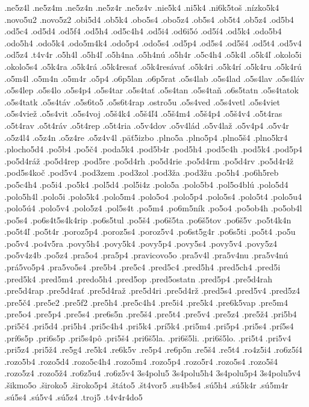 {.ne5z4l
.ne5z4m
.ne5z4n
.ne5z4r
.ne5z4v
.nie5k4
.ni5k4
.ni6k5toš
.nízko5k4
.novo5u2
.novo5z2
.obi5d4
.ob5k4
.obo5s4
.obo5z4
.ob5s4
.ob5t4
.ob5z4
.od5b4
.od5c4
.od5d4
.od5f4
.od5h4
.od5c4h4
.od5i4
.od6i5ó
.od5í4
.od5k4
.odo5b4
.odo5h4
.odo5k4
.odo5m4k4
.odo5p4
.odo5s4
.od5p4
.od5s4
.od5š4
.od5t4
.od5v4
.od5z4
.t4v4r
.o5h4l
.o5h4ľ
.o5h4na
.o5h4nú
.o5h4r
.o5c4h4
.o5k4l
.o5k4ľ
.okolo5i
.okolo5s4
.o5k4ra
.o5k4rá
.o5k4resať
.o5k4resávať
.o5k4ri
.o5k4rí
.o5k4ru
.o5k4rú
.o5m4l
.o5m4n
.o5m4r
.o5p4
.o6p5lan
.o6p5rat
.o5s4lab
.o5s4lad
.o5s4lav
.o5s4láv
.o5s4lep
.o5s4lo
.o5s4p4
.o5s4tar
.o5s4tať
.o5s4tan
.o5s4taň
.o6s5tatn
.o5s4tatok
.o5s4tatk
.o5s4táv
.o5s6to5
.o5s6t4rap
.ostro5u
.o5s4ved
.o5s4vetl
.o5s4viet
.o5s4viež
.o5s4vit
.o5s4voj
.o5š4k4
.o5š4ľ4
.o5š4m4
.o5š4p4
.o5š4v4
.o5t4ras
.o5t4rav
.o5t4ráv
.o5t4rep
.o5t4ria
.o5v4dov
.o5v4lád
.o5v4laž
.o5v4p4
.o5v4r
.o5z4l4
.o5z4n
.o5z4re
.o5z4v4l
.päť5izbo
.plno5a
.plno5p4
.plno5š4
.plno5kr4
.plocho5d4
.po5b4
.po5č4
.poda5k4
.pod5b4r
.pod5h4
.pod5c4h
.pod5k4
.pod5p4
.po5d4ráž
.po5d4rep
.pod5re
.po5d4rh
.po5d4rie
.po5d4rm
.po5d4rv
.po5d4r4ž
.pod5s4koč
.pod5v4
.pod3zem
.pod3zol
.pod3ža
.pod3žu
.po5h4
.po6h5reb
.po5c4h4
.po5i4
.po5k4
.pol5d4
.pol5i4z
.polo5a
.polo5b4
.pol5o4blú
.polo5d4
.polo5h4l
.polo5i
.polo5k4
.polo5m4
.polo5o4
.polo5p4
.polo5s4
.polo5t4
.polo5u4
.polo5ú4
.polo5v4
.polo5z4
.pol5s4t
.po5m4
.po6m5ník
.po5o4
.po5ob4h
.po5ob4l
.po5s4
.po6s4t5s4k4rip
.po6s5tul
.po5š4
.po6š5ta
.po6š5tov
.po6š5v
.po5t4k4n
.po5t4ľ
.po5t4r
.poroz5p4
.poroz5s4
.poroz5v4
.po6st5g4r
.po6s5ti
.po5t4
.po5u
.po5v4
.po4v5ra
.povy5h4
.povy5k4
.povy5p4
.povy5s4
.povy5v4
.povy5z4
.po5v4z4b
.po5z4
.pra5o4
.pra5p4
.pravicovo5o
.pra5v4l
.pra5v4nu
.pra5v4nú
.prá5vo5p4
.pra5vo5s4
.pre5b4
.pre5c4
.pred5c4
.pred5h4
.pred5ch4
.pred5i
.pred5k4
.pred5m4
.predo5h4
.pred5op
.pred5ostatn
.pred5p4
.pre5d4rah
.pre5d4rap
.pre5d4rať
.pre5d4raž
.pre5d4ri
.pre5d4rž
.pred5s4
.pred5v4
.pred5z4
.pre5č4
.pre5e2
.pre5f2
.pre5h4
.pre5c4h4
.pre5i4
.pre5k4
.pre6k5vap
.pre5m4
.pre5o4
.pre5p4
.pre5s4
.pre6s5n
.pre5š4
.pre5t4
.pre5v4
.pre5z4
.pre5ž4
.pri5b4
.pri5č4
.pri5d4
.pri5h4
.pri5c4h4
.pri5k4
.prí5k4
.pri5m4
.pri5p4
.pri5s4
.prí5s4
.prí6s5p
.pri6s5p
.pri5s4pô
.pri5š4
.pri6š5la.
.pri6š5li.
.pri6š5lo.
.pri5t4
.pri5v4
.pri5z4
.pri5ž4
.re5g4
.re5k4
.re6k5v
.re5p4
.re6p5n
.re5š4
.re5t4
.ro4z5i4
.ro6z5í4
.rozo5b4
.rozo5d4
.rozo5c4h4
.rozo5m4
.rozo5p4
.rozo5r4
.rozo5s4
.rozo5š4
.rozo5z4
.rozo5ž4
.ro6z5u4
.ro6z5v4
3s4polu5
3s4polu5h4
3s4polu5p4
3s4polu5v4
.šikmo5o
.široko5
.široko5p4
.štáto5
.št4vor5
.su4b5s4
.sú5h4
.sú5k4r
.sú5m4r
.sú5s4
.sú5v4
.sú5z4
.troj5
.t4v4r4do5
}

